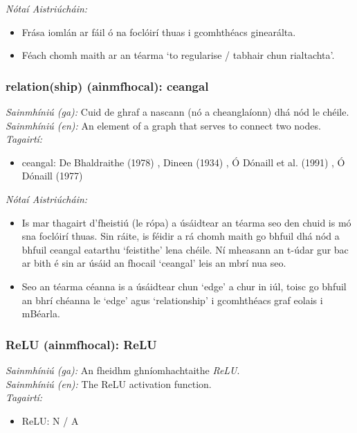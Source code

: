  \noindent \textit{Nótaí Aistriúcháin:}
\begin{itemize}
	\item Frása iomlán ar fáil ó na foclóirí thuas i gcomhthéacs ginearálta.
	\item Féach chomh maith ar an téarma `to regularise / tabhair chun rialtachta'.
\end{itemize}


\subsubsection*{relation(ship) (ainmfhocal): ceangal}
 \noindent \textit{Sainmhíniú (ga):} Cuid de ghraf a nascann (nó a cheanglaíonn) dhá nód le chéile.
\\
 \noindent \textit{Sainmhíniú (en):} An element of a graph that serves to connect two nodes.
\\
 \noindent \textit{Tagairtí:}
\begin{itemize}
	\item ceangal: De Bhaldraithe (1978) \cite{de-bhaldraithe}, Dineen (1934) \cite{dineen}, Ó Dónaill et al. (1991) \cite{focloir-beag}, Ó Dónaill (1977) \cite{odonaill}
\end{itemize}

 \noindent \textit{Nótaí Aistriúcháin:}
\begin{itemize}
	\item Is mar thagairt d'fheistiú (le rópa) a úsáidtear an téarma seo den chuid is mó sna foclóirí thuas. Sin ráite, is féidir a rá chomh maith go bhfuil dhá nód a bhfuil ceangal eatarthu `feistithe' lena chéile. Ní mheasann an t-údar gur bac ar bith é sin ar úsáid an fhocail `ceangal' leis an mbrí nua seo.
	\item Seo an téarma céanna is a úsáidtear chun `edge' a chur in iúl, toisc go bhfuil an bhrí chéanna le `edge' agus `relationship' i gcomhthéacs graf eolais i mBéarla.
\end{itemize}


\subsubsection*{ReLU (ainmfhocal): ReLU}
 \noindent \textit{Sainmhíniú (ga):} An fheidhm ghníomhachtaithe  \noindent \textit{ReLU}.
\\
 \noindent \textit{Sainmhíniú (en):} The ReLU activation function.
\\
 \noindent \textit{Tagairtí:}
\begin{itemize}
	\item ReLU: N / A
\end{itemize}

